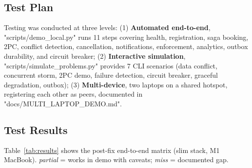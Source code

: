 \documentclass[11pt,a4paper]{article}
\begin{document}
\subsection{Test Plan}

Testing was conducted at three levels: (1) \textbf{Automated end-to-end}, "scripts/demo\_local.py" runs 11 steps covering health, registration, saga booking, 2PC, conflict detection, cancellation, notifications, enforcement, analytics, outbox durability, and circuit breaker; (2) \textbf{Interactive simulation}, "scripts/simulate\_problems.py" provides 7 CLI scenarios (data conflict, concurrent storm, 2PC demo, failure detection, circuit breaker, graceful degradation, outbox); (3) \textbf{Multi-device}, two laptops on a shared hotspot, registering each other as peers, documented in "docs/MULTI\_LAPTOP\_DEMO.md".
 
\subsection{Test Results}

Table~\ref{tab:results} shows the post-fix end-to-end matrix (slim stack, M1 MacBook). \emph{partial} = works in demo with caveats; \emph{miss} = documented gap.
\end{document}

